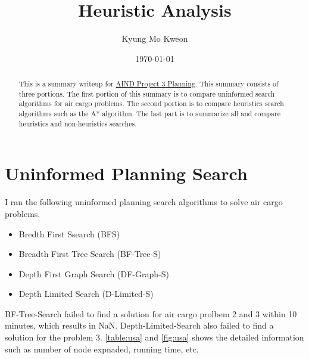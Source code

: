 \documentclass[letterpaper]{article}
\title{Heuristic Analysis}
\author{Kyung Mo Kweon}
\date{\today}
\begin{document}
\maketitle

\begin{abstract}
This is a summary writeup for \href{https://github.com/kkweon/AIND-Planning}{AIND Project 3 Planning}. This summary consists of three portions. The first portion of this summary is to compare uninformed search algorithms for air cargo problems. The second portion is to compare heuristics search algorithms such as the A* algorithm. The last part is to summarize all and compare heuristics and non-heuristics searches.
\end{abstract}

\section{Uninformed Planning Search}
I ran the following uninformed planning search algorithms to solve air cargo problems.
\begin{itemize}
\item Bredth First Ssearch (BFS)
\item Breadth First Tree Search (BF-Tree-S)
\item Depth First Graph Search (DF-Graph-S)
\item Depth Limited Search (D-Limited-S) 
\end{itemize}
BF-Tree-Search failed to find a solution for air cargo prolbem 2 and 3 within 10 minutes, which results in NaN. Depth-Limited-Search also failed to find a solution for the problem 3.
\autoref{table:usa} and \autoref{fig:usa} shows the detailed information such as number of node expnaded, running time, etc.
\end{document}
